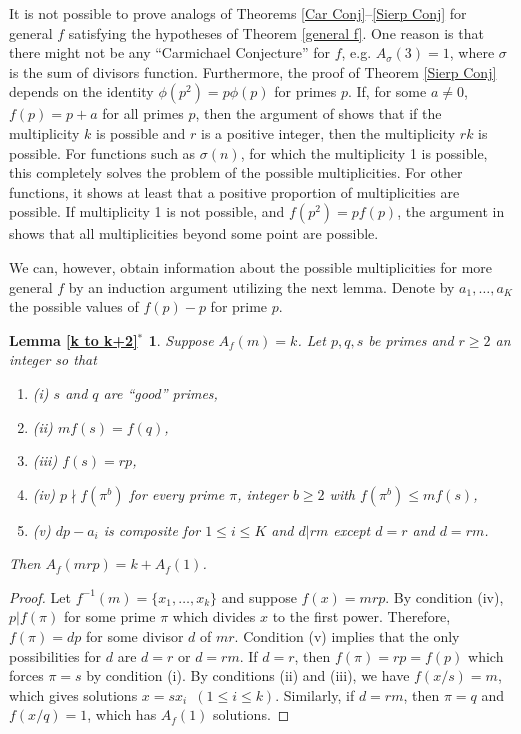 \documentclass[11pt]{amsart}
\theoremstyle{remark}
\theoremstyle{plain}
\numberwithin{equation}{section}
\renewcommand{\(}{\left(}
\renewcommand{\)}{\right)}
\renewcommand{\le}{\leqslant}
\renewcommand{\ge}{\geqslant}
\begin{document}
It is not possible to prove analogs of Theorems 
\ref{Car Conj}--\ref{Sierp Conj} for general $f$ 
satisfying the hypotheses of Theorem
\ref{general f}.  One reason is that there might not be
any ``Carmichael Conjecture'' for $f$, e.g. $A_\sigma(3)=1$, where 
$\sigma$ is the sum of divisors function.
Furthermore, the proof of Theorem \ref{Sierp Conj} depends on the identity
$\phi(p^2)=p\phi(p)$ for primes $p$.  If, for some $a\ne 0$,
 $f(p)=p+a$ for all primes $p$, then the argument of \cite{FK} shows that if
the multiplicity $k$ is possible and $r$ is a positive integer, then the
multiplicity $rk$ is possible.  For functions such as $\sigma(n)$, for which
the multiplicity 1 is possible, this completely solves the problem of the
possible multiplicities.  For other functions, it shows at least that a
positive proportion of multiplicities are possible.  If multiplicity 1 is
not possible, and $f(p^2)=pf(p)$, the argument in \cite{F99} shows that
all multiplicities beyond some point are possible.
 
We can, however, obtain information
about the possible multiplicities for more general $f$ by an induction
argument utilizing the next lemma.  Denote by $a_1, \ldots, a_K$
the possible values of $f(p)-p$ for prime $p$.

\newtheorem*{lemkk*}{Lemma \ref{k to k+2}$^*$}
\begin{lemkk*}
Suppose $A_f(m)=k$.  Let $p,q,s$ be
primes and $r\ge 2$ an integer so that
\begin{enumerate}
\item{(i)} $s$ and $q$ are ``good'' primes,
\item{(ii)} $mf(s) = f(q)$,
\item{(iii)} $f(s)=rp$,
\item{(iv)} $p\nmid f(\pi^b)$ for every prime $\pi$, integer $b\ge 2$
with $f(\pi^b)\le mf(s)$,
\item{(v)} $dp-a_i$ is composite for $1\le i\le K$ and $d|rm$ except
$d=r$ and $d=rm$.
\end{enumerate}
Then $A_f(mrp)=k+A_f(1)$.
\end{lemkk*}

\begin{proof}  Let $f^{-1}(m)=\{ x_1, \ldots, x_k \}$ and suppose $f(x)=mrp$.
By condition (iv), $p|f(\pi)$ for some prime $\pi$ which divides $x$ to the
first power.  Therefore, $f(\pi)=dp$ for some divisor $d$ of $mr$.  Condition
(v) implies that the only possibilities for $d$ are $d=r$ or $d=rm$.  If
$d=r$, then $f(\pi)=rp=f(p)$ which forces $\pi=s$ by condition (i).
By conditions (ii) and (iii), we have $f(x/s)=m$, which gives solutions
$x=sx_i$\, $(1\le i\le k)$.  Similarly, if $d=rm$, then $\pi=q$ and
$f(x/q)=1$, which has $A_f(1)$ solutions.
\end{proof}
\end{document}
